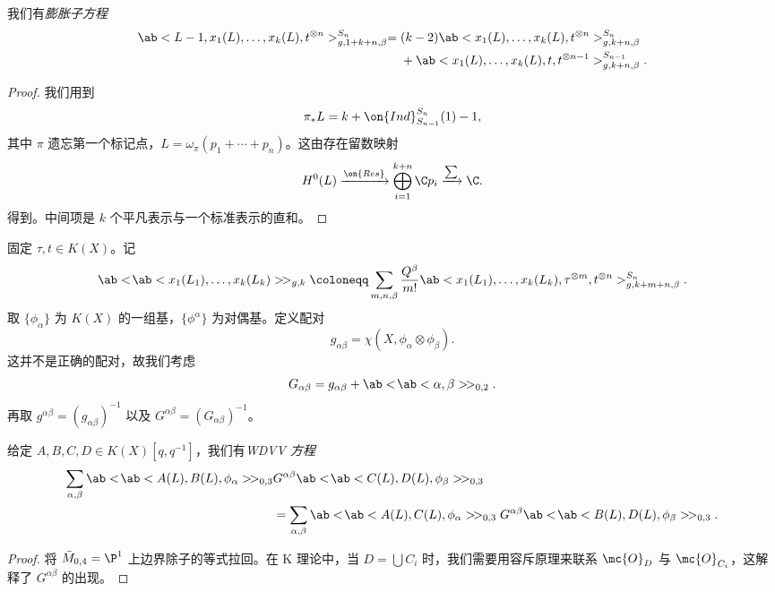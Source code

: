 \begin{lem}
    我们有\textit{膨胀子方程}
    \begin{align*}
        \ab<L-1, x_1(L), \ldots, x_k(L), t^{\otimes n}>_{g,1+k+n,\beta}^{S_n} ={}& (k-2)\ab<x_1(L), \ldots, x_k(L), t^{\otimes n}>_{g,k+n,\beta}^{S_n} \\
        &+ \ab<x_1(L), \ldots, x_k(L), t, t^{\otimes n-1}>_{g,k+n,\beta}^{S_{n-1}}.
    \end{align*}
\end{lem}

\begin{proof}
    我们用到
    \[ \pi_* L = k + \on{Ind}_{S_{n-1}}^{S_n}(1) - 1, \]
    其中 \(\pi\) 遗忘第一个标记点，\(L = \omega_{\pi} (p_1 + \cdots + p_n)\)。这由存在留数映射
    \[ H^0(L) \xrightarrow{\on{Res}} \bigoplus_{i=1}^{k+n} \C p_i \xrightarrow{\sum} \C. \]
    得到。中间项是 \(k\) 个平凡表示与一个标准表示的直和。
\end{proof}

\begin{notn}
    固定 \(\tau, t \in K(X)\)。记
    \[ \ab<\!\ab<x_1(L_1), \ldots, x_k(L_k)>\!>_{g,k} \coloneqq \sum_{m,n,\beta} \frac{Q^{\beta}}{m!} \ab<x_1(L_1), \ldots, x_k(L_k), \tau^{\otimes m}, t^{\otimes n}>_{g,k+m+n,\beta}^{S_n}. \]
    取 \(\{\phi_{\alpha}\}\) 为 \(K(X)\) 的一组基，\(\{\phi^{\alpha}\}\) 为对偶基。定义配对
    \[ g_{\alpha\beta} = \chi(X, \phi_{\alpha} \otimes \phi_{\beta}). \]
    这并不是正确的配对，故我们考虑
    \[ G_{\alpha\beta} = g_{\alpha\beta} + \ab<\!\ab<\alpha,\beta>\!>_{0,2}. \]
    再取 \(g^{\alpha\beta} = (g_{\alpha\beta})^{-1}\) 以及 \(G^{\alpha\beta} = (G_{\alpha\beta})^{-1}\)。
\end{notn}

\begin{lem}
    给定 \(A,B,C,D \in K(X)[q,q^{-1}]\)，我们有\textit{WDVV 方程}
    \begin{align*}
        \sum_{\alpha,\beta} \ab<\!\ab< A(L), B(L), \phi_{\alpha}>\! >_{0,3}& G^{\alpha\beta}\ab<\!\ab< C(L), D(L), \phi_{\beta}>\! >_{0,3} \\
        &= \sum_{\alpha,\beta} \ab<\!\ab< A(L), C(L), \phi_{\alpha}>\! >_{0,3} G^{\alpha\beta}\ab<\!\ab< B(L), D(L), \phi_{\beta}>\! >_{0,3}. 
    \end{align*}
\end{lem}

\begin{proof}
    将 \(\bar{M}_{0,4} = \P^1\) 上边界除子的等式拉回。在 K 理论中，当 \(D = \bigcup C_i\) 时，我们需要用容斥原理来联系 \(\mc{O}_D\) 与 \(\mc{O}_{C_i}\)，这解释了 \(G^{\alpha\beta}\) 的出现。
\end{proof}

